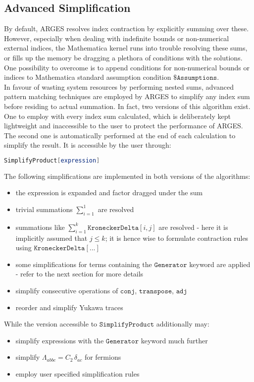 \documentclass{scrartcl}
\begin{document}
\subsection{Advanced Simplification}
By default, ARGES resolves index contraction by explicitly summing over these. However, especially when dealing with indefinite bounds or non-numerical external indices, the Mathematica kernel runs into trouble resolving these sums, or fills up the memory be dragging a plethora of conditions with the solutions. One possibility to overcome is to append conditions for non-numerical bounds or indices to Mathematica standard assumption condition $\$\mathtt{Assumptions}$. \\ In favour of wasting system resources by performing nested sums, advanced pattern matching techniques are employed by ARGES to simplify any index sum before residing to actual summation. In fact, two versions of this algorithm exist. One to employ with every index sum calculated, which is deliberately kept lightweight and inaccessible to the user to protect the performance of ARGES. The second one is automatically performed at the end of each calculation to simplify the result. It is accessible by the user through:
\begin{lstlisting}[language=mathematica,mathescape,columns=flexible,backgroundcolor=\color{light-gray}]
SimplifyProduct[expression]
\end{lstlisting}
The following simplifications are implemented in both versions of the algorithms:
\begin{itemize}
\item the expression is expanded and factor dragged under the sum
\item trivial summations $\sum_{i=1}^1$ are resolved
\item summations like $\sum_{i=1}^{k} \mathtt{KroneckerDelta}[i,j]$ are resolved - here it is implicitly assumed that $j \leq k$; it is hence wise to formulate contraction rules using $\mathtt{KroneckerDelta}[...]$
\item some simplifications for terms containing the $\mathtt{Generator}$ keyword are applied - refer to the next section for more details
\item simplify consecutive operations of $\mathtt{conj}$, $\mathtt{transpose}$, $\mathtt{adj}$
\item reorder and simplify Yukawa traces 
\end{itemize}
While the version accessible to $\mathtt{SimplifyProduct}$ additionally may:
\begin{itemize}
\item simplify expressions with the $\mathtt{Generator}$ keyword much further
\item simplify $\Lambda_{abbc} = C_2 \,\delta_{ac}$ for fermions
\item employ user specified simplification rules
\end{itemize}
\end{document}
